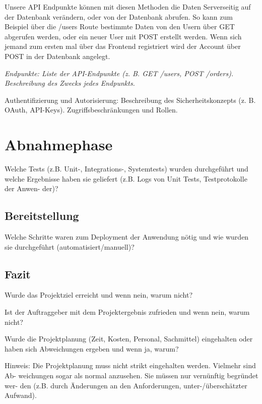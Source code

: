 \documentclass[a4paper,12pt]{article}
\begin{document}
Unsere API Endpunkte können mit diesen Methoden die Daten Serverseitig auf der Datenbank verändern, oder von der Datenbank abrufen. So kann zum Beispiel über die /users Route bestimmte Daten von den Usern über GET abgerufen werden, oder ein neuer User mit POST erstellt werden. Wenn sich jemand zum ersten mal über das Frontend registriert wird der Account über POST in der Datenbank angelegt. 

\textit{Endpunkte: Liste der API-Endpunkte (z. B. GET /users, POST /orders).
Beschreibung des Zwecks jedes Endpunkts.}

Authentifizierung und Autorisierung: Beschreibung des Sicherheitskonzepts (z. B.
OAuth, API-Keys).  Zugriffsbeschränkungen und Rollen.

\newpage \section{Abnahmephase}
Welche Tests (z.B. Unit-, Integrations-,
Systemtests) wurden durchgeführt und welche Ergebnisse haben sie geliefert
(z.B. Logs von Unit Tests, Testprotokolle der Anwen- der)?

\subsection{Bereitstellung}
Welche Schritte waren zum Deployment der Anwendung
nötig und wie wurden sie durchgeführt (automatisiert/manuell)?

\subsection{Fazit}
Wurde das Projektziel erreicht und wenn nein, warum nicht?

Ist der Auftraggeber mit dem Projektergebnis zufrieden und wenn nein, warum
nicht?

Wurde die Projektplanung (Zeit, Kosten, Personal, Sachmittel) eingehalten oder
haben sich Abweichungen ergeben und wenn ja, warum?

Hinweis: Die Projektplanung muss nicht strikt eingehalten werden. Vielmehr sind
Ab- weichungen sogar als normal anzusehen. Sie müssen nur vernünftig begründet
wer- den (z.B. durch Änderungen an den Anforderungen, unter-/überschätzter
Aufwand).

\newpage
\printbibliography
\end{document}
